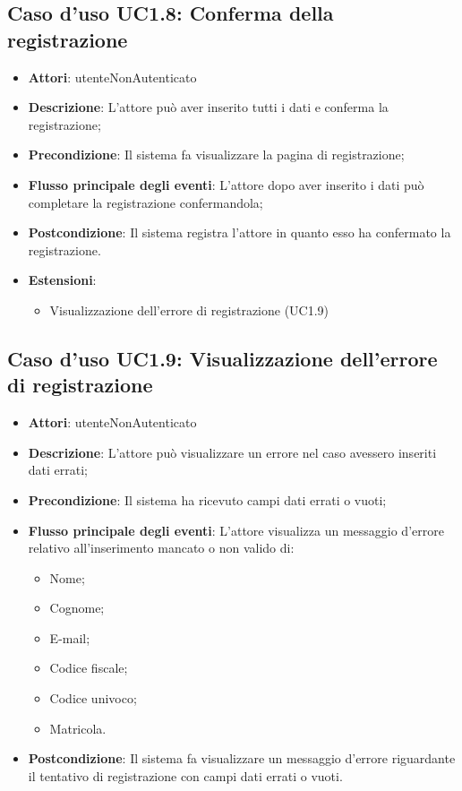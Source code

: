 \subsection{Caso d'uso \texorpdfstring{UC1.8}{UC1.8}: Conferma della registrazione}
\begin{itemize}
\item \textbf{Attori}: utenteNonAutenticato
\item \textbf{Descrizione}: L'attore può aver inserito tutti i dati  e conferma la registrazione;
\item \textbf{Precondizione}: Il sistema fa visualizzare la pagina di registrazione;
\item \textbf{Flusso principale degli eventi}: L'attore dopo aver inserito i dati può completare la registrazione confermandola;
\item \textbf{Postcondizione}: Il sistema registra l'attore in quanto esso ha confermato la registrazione.
\item \textbf{Estensioni}:
\begin{itemize}
\item Visualizzazione dell'errore di registrazione (UC1.9)
\end{itemize}
\end{itemize}
\subsection{Caso d'uso \texorpdfstring{UC1.9}{UC1.9}: Visualizzazione dell'errore di registrazione}
\begin{itemize}
\item \textbf{Attori}: utenteNonAutenticato
\item \textbf{Descrizione}: L'attore può visualizzare un errore nel caso avessero inseriti dati errati;
\item \textbf{Precondizione}: Il sistema ha ricevuto campi dati errati o vuoti;
\item \textbf{Flusso principale degli eventi}: L'attore visualizza un messaggio d'errore relativo all'inserimento mancato o non valido di:
\begin{itemize}
\item Nome;
\item Cognome;
\item E-mail;
\item Codice fiscale;
\item Codice univoco;
\item Matricola.
\end{itemize}
\item \textbf{Postcondizione}: Il sistema fa visualizzare un messaggio d'errore riguardante il tentativo di registrazione con campi dati errati o vuoti.
\end{itemize}
